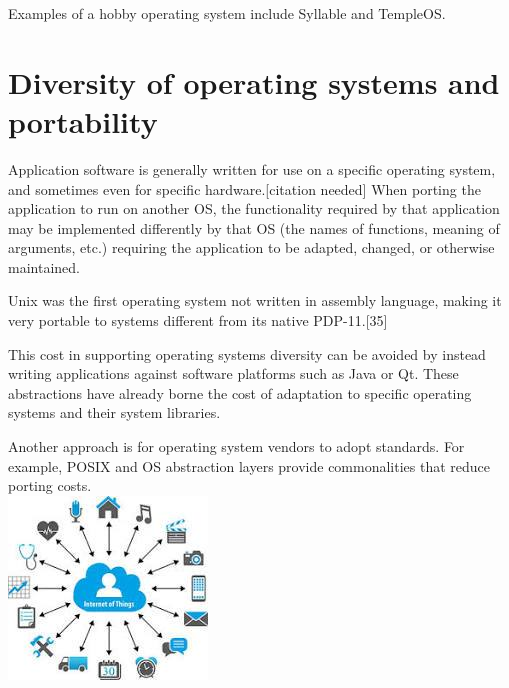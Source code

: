 \documentclass[oneside, 11 pt]{report}
\begin{document}
Examples of a hobby operating system include Syllable and TempleOS.
\section{Diversity of operating systems and portability}
Application software is generally written for use on a specific operating system, and sometimes even for specific hardware.[citation needed] When porting the application to run on another OS, the functionality required by that application may be implemented differently by that OS (the names of functions, meaning of arguments, etc.) requiring the application to be adapted, changed, or otherwise maintained.

Unix was the first operating system not written in assembly language, making it very portable to systems different from its native PDP-11.[35]

This cost in supporting operating systems diversity can be avoided by instead writing applications against software platforms such as Java or Qt. These abstractions have already borne the cost of adaptation to specific operating systems and their system libraries.

Another approach is for operating system vendors to adopt standards. For example, POSIX and OS abstraction layers provide commonalities that reduce porting costs.\\
\includegraphics[width = 170 pt]{img.jpg}
\end{document}
